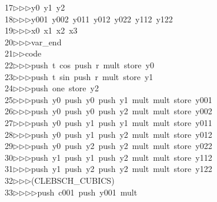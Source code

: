 \begin{tabbing}
17\>$\triangleright$\>$\triangleright$\>$\triangleright$\>y0\ y1\ y2\ \\[0pt]
18\>$\triangleright$\>$\triangleright$\>$\triangleright$\>y001\ y002\ y011\ y012\ y022\ y112\ y122\ \\[0pt]
19\>$\triangleright$\>$\triangleright$\>$\triangleright$\>x0\ x1\ x2\ x3\ \\[0pt]
20\>$\triangleright$\>$\triangleright$\>$\triangleright$\>var\_end\ \\[0pt]
21\>$\triangleright$\>$\triangleright$\>code\ \\[0pt]
22\>$\triangleright$\>$\triangleright$\>$\triangleright$\>push\ t\ cos\ push\ r\ mult\ store\ y0\ \\[0pt]
23\>$\triangleright$\>$\triangleright$\>$\triangleright$\>push\ t\ sin\ push\ r\ mult\ store\ y1\ \\[0pt]
24\>$\triangleright$\>$\triangleright$\>$\triangleright$\>push\ one\ store\ y2\ \\[0pt]
25\>$\triangleright$\>$\triangleright$\>$\triangleright$\>push\ y0\ push\ y0\ push\ y1\ mult\ mult\ store\ y001\ \\[0pt]
26\>$\triangleright$\>$\triangleright$\>$\triangleright$\>push\ y0\ push\ y0\ push\ y2\ mult\ mult\ store\ y002\ \\[0pt]
27\>$\triangleright$\>$\triangleright$\>$\triangleright$\>push\ y0\ push\ y1\ push\ y1\ mult\ mult\ store\ y011\ \\[0pt]
28\>$\triangleright$\>$\triangleright$\>$\triangleright$\>push\ y0\ push\ y1\ push\ y2\ mult\ mult\ store\ y012\ \\[0pt]
29\>$\triangleright$\>$\triangleright$\>$\triangleright$\>push\ y0\ push\ y2\ push\ y2\ mult\ mult\ store\ y022\ \\[0pt]
30\>$\triangleright$\>$\triangleright$\>$\triangleright$\>push\ y1\ push\ y1\ push\ y2\ mult\ mult\ store\ y112\ \\[0pt]
31\>$\triangleright$\>$\triangleright$\>$\triangleright$\>push\ y1\ push\ y2\ push\ y2\ mult\ mult\ store\ y122\ \\[0pt]
32\>$\triangleright$\>$\triangleright$\>$\triangleright$\>(CLEBSCH\_CUBICS)\ \\[0pt]
33\>$\triangleright$\>$\triangleright$\>$\triangleright$\>$\triangleright$\>push\ c001\ push\ y001\ mult\ \\[0pt]

\end{tabbing}
